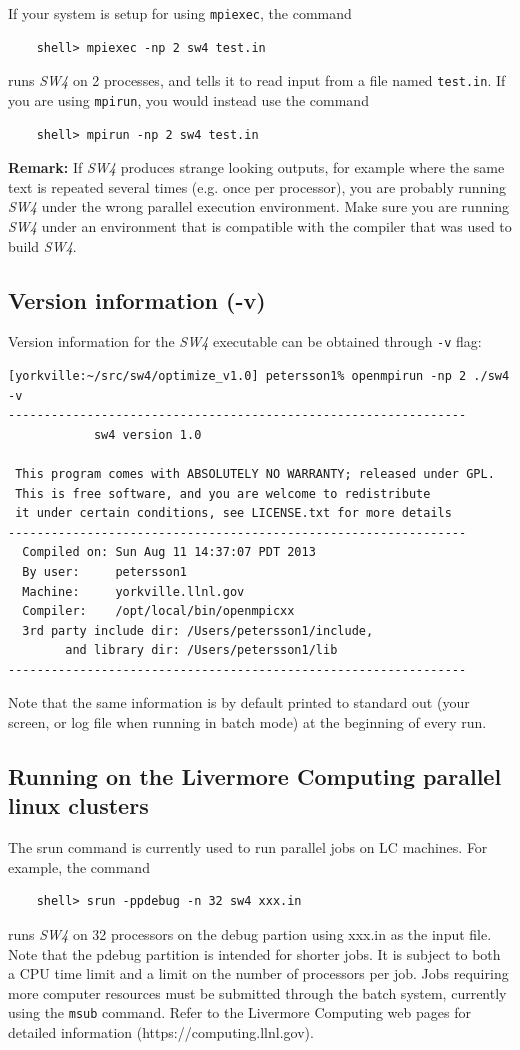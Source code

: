 \documentclass[11pt]{report}
\begin{document}
If your system is setup for using \verb+mpiexec+, the command
\begin{verbatim}
	shell> mpiexec -np 2 sw4 test.in
\end{verbatim}
runs \emph{SW4} on 2 processes, and tells it to read input from a file named {\tt test.in}.  If you
are using \verb+mpirun+, you would instead use the command
\begin{verbatim}
	shell> mpirun -np 2 sw4 test.in
\end{verbatim}
{\bf Remark: } If \emph{SW4} produces strange looking outputs, for example where the same text is
repeated several times (e.g. once per processor), you are probably running \emph{SW4} under the
wrong parallel execution environment. Make sure you are running \emph{SW4} under an environment that
is compatible with the compiler that was used to build \emph{SW4}.
%

\subsection{Version information (-v)}

Version information for the \emph{SW4} executable can be obtained through {\tt -v} flag:
\begin{verbatim}
[yorkville:~/src/sw4/optimize_v1.0] petersson1% openmpirun -np 2 ./sw4 -v
----------------------------------------------------------------
            sw4 version 1.0

 This program comes with ABSOLUTELY NO WARRANTY; released under GPL.
 This is free software, and you are welcome to redistribute     
 it under certain conditions, see LICENSE.txt for more details  
----------------------------------------------------------------
  Compiled on: Sun Aug 11 14:37:07 PDT 2013
  By user:     petersson1
  Machine:     yorkville.llnl.gov
  Compiler:    /opt/local/bin/openmpicxx
  3rd party include dir: /Users/petersson1/include, 
        and library dir: /Users/petersson1/lib
----------------------------------------------------------------
\end{verbatim}
Note that the same information is by default printed to standard out (your screen, or log file when
running in batch mode) at the beginning of every run.

\subsection{Running on the Livermore Computing parallel linux clusters}
%
The srun command is currently used to run parallel jobs on LC machines. For example, the command
\begin{verbatim}
	shell> srun -ppdebug -n 32 sw4 xxx.in
\end{verbatim}
runs \emph{SW4} on 32 processors on the debug partion using xxx.in as the input file. Note that the
pdebug partition is intended for shorter jobs. It is subject to both a CPU time limit and a limit on
the number of processors per job. Jobs requiring more computer resources must be submitted through
the batch system, currently using the \verb+msub+ command. Refer to the Livermore Computing web pages for
detailed information (https://computing.llnl.gov).
\end{document}
